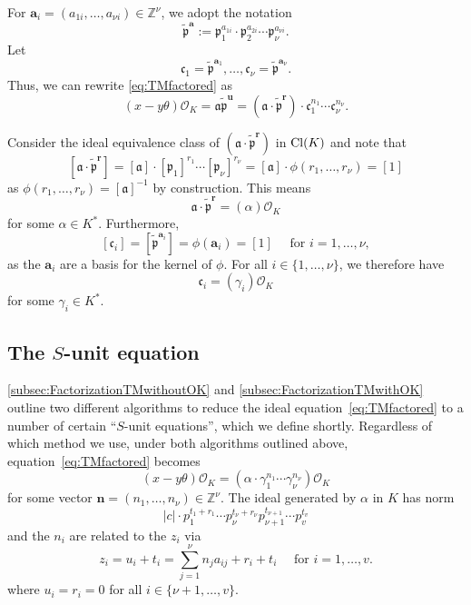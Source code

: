For $\mathbf{a}_i=(a_{1i},\dotsc,a_{\nu i}) \in \mathbb{Z}^{\nu}$, we adopt the notation 
\[\tilde{\mathfrak{p}}^\mathbf{a} :=\mathfrak{p}_1^{a_{1i}}\cdot \mathfrak{p}_2^{a_{2i}} \cdots \mathfrak{p}_{\nu}^{a_{\nu i}}.\]
Let
\[\mathfrak{c}_1= \tilde{\mathfrak{p}}^{\mathbf{a}_1},\dotsc,\mathfrak{c}_{\nu}= \tilde{\mathfrak{p}}^{\mathbf{a}_{\nu}}.\]
Thus, we can rewrite \eqref{eq:TMfactored} as
\[(x-y\theta) \mathcal{O}_K = \mathfrak{a} \tilde{\mathfrak{p}}^{\mathbf{u}} = (\mathfrak{a} \cdot \tilde{\mathfrak{p}}^\mathbf{r}) \cdot \mathfrak{c}_1^{n_1}\cdots \mathfrak{c}_{\nu}^{n_{\nu}}.\]

Consider the ideal equivalence class of $(\mathfrak{a} \cdot \tilde{\mathfrak{p}}^\mathbf{r})$ in $\operatorname{Cl}(K)$ and note that
\[[\mathfrak{a} \cdot \tilde{\mathfrak{p}}^\mathbf{r}] 
	= [\mathfrak{a}] \cdot [\mathfrak{p}_1]^{r_1}\cdots [\mathfrak{p}_{\nu}]^{r_{\nu}} 
	= [\mathfrak{a}]\cdot \phi(r_1,\dotsc,r_{\nu})=[1]\]
as $\phi(r_1,\dotsc,r_{\nu})=[\mathfrak{a}]^{-1}$ by construction. This means 
\[\mathfrak{a} \cdot \tilde{\mathfrak{p}}^\mathbf{r}= (\alpha) \mathcal{O}_K\]
for some $\alpha \in K^*$. Furthermore, 
\[[\mathfrak{c}_i] = [\tilde{\mathfrak{p}}^{\mathbf{a}_i}] = \phi(\mathbf{a}_i) = [1] \quad \text{ for } i = 1, \dots, \nu,\]
as the $\mathbf{a}_i$ are a basis for the kernel of $\phi$. For all $i \in \{1, \dots, {\nu}\}$, we therefore have
\[\mathfrak{c}_i= (\gamma_i) \mathcal{O}_K\]
for some $\gamma_i \in K^*$.


\subsection{The $S$-unit equation}
\label{subsec:SUnitEquation}

\autoref{subsec:FactorizationTMwithoutOK} and  \autoref{subsec:FactorizationTMwithOK} outline two different algorithms to reduce the ideal equation~\eqref{eq:TMfactored} to a number of certain ``$S$-unit equations'', which we define shortly. Regardless of which method we use, under both algorithms outlined above, equation~\eqref{eq:TMfactored} becomes
\begin{equation} \label{eq:TMprincipal}
(x-y\theta) \mathcal{O}_K= (\alpha \cdot \gamma_1^{n_1} \cdots \gamma_{\nu}^{n_{\nu}}) \mathcal{O}_K
\end{equation}
for some vector $\mathbf{n} = (n_1, \dots, n_{\nu}) \in \mathbb{Z}^{\nu}$. The ideal generated by $\alpha$ in $K$ has norm 
\[|c|\cdot p_1^{t_1 + r_1} \cdots p_{\nu}^{t_{\nu} + r_{\nu}}p_{\nu +1}^{t_{\nu +1}} \cdots p_v^{t_v}\]
and the $n_i$ are related to the $z_i$ via
\[z_i = u_i + t_i = \sum_{j = 1}^{\nu}n_ja_{ij} + r_i + t_i \quad \text{ for } i =1, \dots, v.\]
where $u_i = r_i = 0$ for all $i \in \{\nu + 1, \dots, v\}$. 

